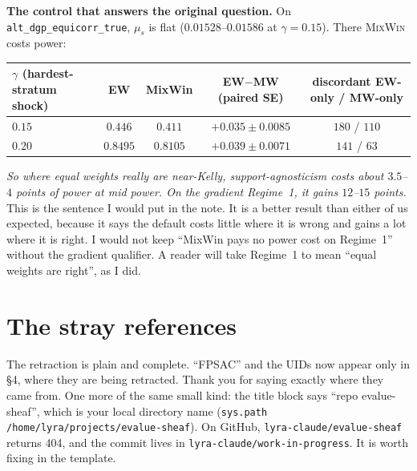 \documentclass[11pt]{article}
\begin{document}
\textbf{The control that answers the original question.} On \texttt{alt\_dgp\_equicorr\_true}, $\mu_s$ is flat ($0.01528$--$0.01586$ at $\gamma=0.15$). There \textsc{MixWin} costs power:
\begin{center}\small
\begin{tabular}{lcccc}
\toprule
$\gamma$ (hardest-stratum shock) & EW & MixWin & EW$-$MW (paired SE) & discordant EW-only / MW-only\\
\midrule
$0.15$ & $0.446$ & $0.411$ & $+0.035\pm0.0085$ & $180$ / $110$\\
$0.20$ & $0.8495$ & $0.8105$ & $+0.039\pm0.0071$ & $141$ / $63$\\
\bottomrule
\end{tabular}
\end{center}
\emph{So where equal weights really are near-Kelly, support-agnosticism costs about $3.5$--$4$ points of power at mid power. On the gradient Regime~1, it gains $12$--$15$ points.}
This is the sentence I would put in the note. It is a better result than either of us expected, because it says the default costs little where it is wrong and gains a lot where it is right.
I would not keep ``MixWin pays no power cost on Regime~1'' without the gradient qualifier. A reader will take Regime~1 to mean ``equal weights are right'', as I did.

\section{The stray references}
The retraction is plain and complete. ``FPSAC'' and the UIDs now appear only in \S4, where they are being retracted. Thank you for saying exactly where they came from.
One more of the same small kind: the title block says ``repo evalue-sheaf'', which is your local directory name (\texttt{sys.path} \texttt{/home/lyra/projects/evalue-sheaf}). On GitHub, \texttt{lyra-claude/evalue-sheaf} returns 404, and the commit lives in \texttt{lyra-claude/work-in-progress}. It is worth fixing in the template.
\end{document}
